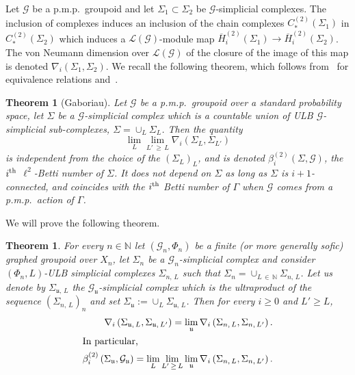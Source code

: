 \documentclass[10pt]{amsart}
\newtheorem{theo}[cdrthm]{Theorem}
\theoremstyle{definition}
\newcommand{\Nmath}{\mathbb{N}}
\newcommand{\cg}{\mathcal{G}}
\newcommand{\uu}{\mathfrak{u}}
\newcommand{\ul}{\mathfrak{u}}
\newcommand{\pmp}{p.m.p.\ }
\newcommand{\lvN}{\mathcal{L}(\cg)}
\begin{document}
Let $\cg$ be a \pmp groupoid and let $\Sigma_1\subset \Sigma_2$ be $\cg$-simplicial complexes. The inclusion of complexes induces an inclusion of the chain complexes $C_*^{(2)}(\Sigma_1)$ in $C_*^{(2)}(\Sigma_2)$ which induces a $\lvN$-module map $\overline H_i^{(2)}(\Sigma_1) \to \overline H_i^{(2)}(\Sigma_2)$. The von Neumann dimension over $\lvN$ of the closure of the image of this map is denoted $\nabla_i(\Sigma_1,\Sigma_2)$. We recall the following theorem, which follows from~\cite[Proposition~3.9, Théorème~3.13]{gab_ihes} for equivalence relations and~\cite[Proposition~3.7]{Takimoto-cost-L2-2005}.

\begin{theo}[Gaboriau]
Let $\cg$ be a \pmp groupoid over a standard probability space, let $\Sigma$ be a $\cg$-simplicial complex which is a countable union of ULB $\cg$-simplicial sub-complexes, $\Sigma=\cup_L\Sigma_L$. Then the quantity
\begin{equation}\label{eq:formula_for_betti_number}
\lim_{L} \lim_{L'\,\geq\,L} \nabla_i\left(\Sigma_{L},\Sigma_{L'}\right)
\end{equation}
is independent from the choice of the $(\Sigma_L)_L$, and is denoted $\beta^{(2)}_i(\Sigma,\cg)$, the $i^{\rm th}$ $\ell^2$-Betti number of $\Sigma$. It does not depend on $\Sigma$ as long as $\Sigma$ is $i+1$-connected, and coincides with the $i^{\rm th}$ Betti number of $\Gamma$ when $\cg$ comes from a \pmp action of $\Gamma$.
\end{theo}

We will prove the following theorem.

\begin{theo}\label{thm:limitgeneral}
For every $n\in\Nmath$ let $(\cg_n,\Phi_n)$ be a finite (or more generally sofic) graphed groupoid over $X_n$, let $\Sigma_n$ be a $\cg_n$-simplicial complex and consider $(\Phi_n,L)$-ULB simplicial complexes $\Sigma_{n,\,L}$ such that $\Sigma_n=\cup_{L\,\in\,\Nmath} \Sigma_{n,\,L}$. Let us denote by $\Sigma_{\ul,\,L}$ the $\cg_\ul$-simplicial complex which is the ultraproduct of the sequence $(\Sigma_{n,\,L})_n$ and set $\Sigma_\ul:=\cup_L\Sigma_{\ul,\,L}$. Then for every $i \geq 0$ and $L' \geq L$,
\begin{align*}
\nabla_i\left(\Sigma_{\ul,\,L},\Sigma_{\ul,\,L'}\right) = \lim_\uu \nabla_i\left(\Sigma_{n,\,L},\Sigma_{n,\,L'}\right).
\\
\intertext{In particular,}
\beta^{(2)}_i\left(\Sigma_\ul,\cg_\ul\right) = \lim_{L} \lim_{L'\,\geq\,L} \lim_\uu \nabla_i\left(\Sigma_{n,\,L},\Sigma_{n,\,L'}\right).
\end{align*}
\end{theo}
\end{document}
